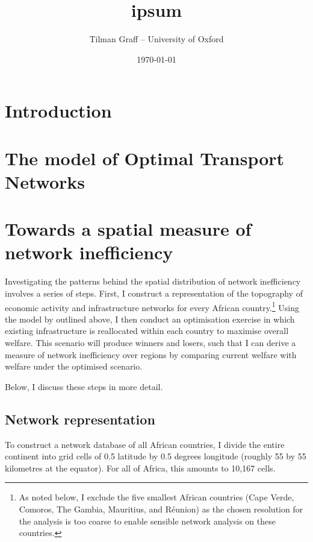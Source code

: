 \documentclass[11pt, oneside]{article}   	%
\title{ipsum}
\author{Tilman Graff -- University of Oxford}
\date{\today}
\begin{document}

\maketitle


\section{Introduction}

\section{The \cite{fajgelbaum_optimal_2017} model of Optimal Transport Networks}

\section{Towards a spatial measure of network inefficiency}

Investigating the patterns behind the spatial distribution of network inefficiency involves a series of steps. First, I construct a representation of the topography of economic activity and infrastructure networks for every African country.\footnote{As noted below, I exclude the five smallest African countries (Cape Verde, Comoros, The Gambia, Mauritius, and Réunion) as the chosen resolution for the analysis is too coarse to enable sensible network analysis on these countries.} Using the model by \cite{fajgelbaum_optimal_2017} outlined above, I then conduct an optimisation exercise in which existing infrastructure is reallocated within each country to maximise overall welfare. This scenario will produce winners and losers, such that I can derive a measure of network inefficiency over regions by comparing current welfare with welfare under the optimised scenario.

Below, I discuss these steps in more detail.

\subsection{Network representation}

To construct a network database of all African countries, I divide the entire continent into grid cells of 0.5 latitude by 0.5 degrees longitude (roughly 55 by 55 kilometres at the equator). For all of Africa, this amounts to 10,167 cells. 




\vspace{\fill}
\begin{spacing}{1.0}
\setlength{\bibsep}{2.5pt plus 1.5ex}

\end{spacing}
\end{document}

